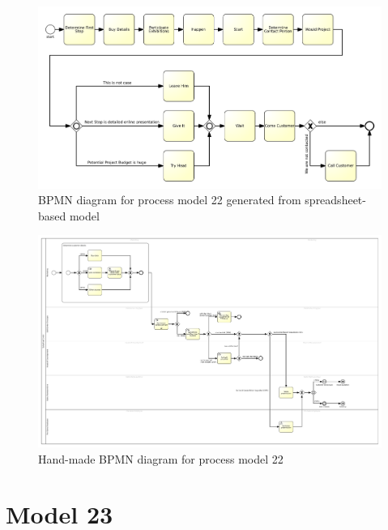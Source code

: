 \begin{figure}[H]
	\centering
	\includegraphics[scale=0.4]{./generated_bpmn/model22.pdf}
	\caption{BPMN diagram for process model 22 generated from spreadsheet-based model}
	\label{bpmn:generated_model22}
\end{figure}

\begin{figure}[H]
	\centering
	\includegraphics[width=0.95\textheight, angle=90]{./bpmn/model22.pdf}
	\caption{Hand-made BPMN diagram for process model 22}
	\label{bpmn:model22}
\end{figure}

\section{Model 23}
\begin{tcolorbox}[
	breakable,
	arc=0mm,
	left=1pt,
	right = 1pt,
	boxrule=0mm,
	colback = {white},
	]
	\texttt{}
\end{tcolorbox}
\label{txt:model23}

